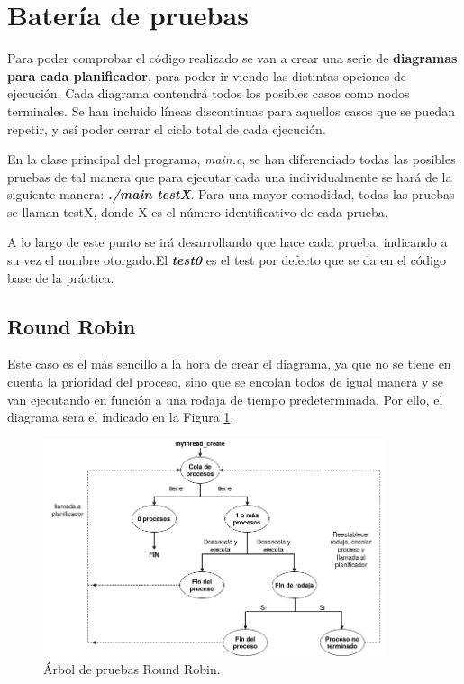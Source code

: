 \documentclass[10pt, spanish, pdftex]{template/UC3M_document}
\begin{document}
\section{Batería de pruebas}
Para poder comprobar el código realizado se van a crear una serie de \textbf{diagramas para cada planificador}, para poder ir viendo las distintas opciones de ejecución. Cada diagrama contendrá todos los posibles casos como nodos terminales. Se han incluido líneas discontinuas para aquellos casos que se puedan repetir, y así poder cerrar el ciclo total de cada ejecución.

En la clase principal del programa, \textit{main.c}, se han diferenciado todas las posibles pruebas de tal manera que para ejecutar cada una individualmente se hará de la siguiente manera: \textbf{\textit{./main testX}}. Para una mayor comodidad, todas las pruebas se llaman testX, donde X es el número identificativo de cada prueba.

A lo largo de este punto se irá desarrollando que hace cada prueba, indicando a su vez el nombre otorgado.El \textbf{\textit{test0}} es el test por defecto que se da en el código base de la práctica.

\subsection{Round Robin}
Este caso es el más sencillo a la hora de crear el diagrama, ya que no se tiene en cuenta la prioridad del proceso, sino que se encolan todos de igual manera y se van ejecutando en función a una rodaja de tiempo predeterminada. Por ello, el diagrama sera el indicado en la Figura \ref{fig:testRR}.

\vspace{0.5cm}
\begin{figure}[h]
    \centering
    \includegraphics[width=10cm]{arboles/testRR.png}
    \caption{Árbol de pruebas Round Robin.}
    \label{fig:testRR}
\end{figure}
\end{document}
